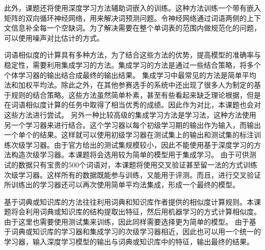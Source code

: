 此外，课题还将使用深度学习方法辅助词嵌入的训练。这种方法训练一个带有嵌入矩阵的双向循环神经网络，用来解决词预测问题。令神经网络通过词语两侧的上下文信息补全每一个空缺词。为了解决需要在整个单词表的范围内做规范化的问题，可以使用噪声对比估计的方式。

词语相似度的计算具有多种方法，为了结合这些方法的优势，提高模型的准确率与稳定性，需要利用集成学习的方法。集成学习的方法是通过一些结合策略，将多个个体学习器的输出结合成最终的输出结果。
集成学习中最常见的方法是简单平均法和加权平均法。除此之外，在其他参赛选手的系统中还出现了很多人为制定的基于规则的结合策略。这些方法虽然简单朴素，甚至有些看起来缺乏理论根据，但是在词语相似度计算的任务中取得了相当优秀的成绩。因此作为对比，本课题也会对这些方法进行尝试。
另外一种比较高级的集成学习方法是学习法，这种方法使用另一个学习器来进行结合。这个学习器以每个初级学习期的输出作为输入，而输出一个单个的结果。这样就可以使用初级学习器在测试集上的输出和测试集的标注训练次级学习器。由于官方给出的测试集规模较小，因此不能使用基于深度学习的方法构造次级学习器。本课题将会选用较为简单的模型用于集成学习。
由于可供测试的数据只有宝贵的500个词语对，本课题将使用交叉验证甚至留一法的方式训练次级学习器。这样所有的数据既能参与训练，又能用于评测。而且，进行交叉验证所训练出的学习器还可以再次使用简单平均法集成，形成一个最终的模型。

基于词典或知识库的方法往往利用词典和知识库作者提供的相似度计算规则。本课题将会利用词典或知识库的结构提取出特征，然后用机器学习的方式计算相似度。由于这里也需要使用测试集来训练，因此同样需要选择更为简单的模型。
由于基于词典或知识库的学习器和集成学习的次级学习器相近，因此也可以用一个统一的学习器，输入深度学习模型的输出与词典或知识库中的特征，输出最终的结果。